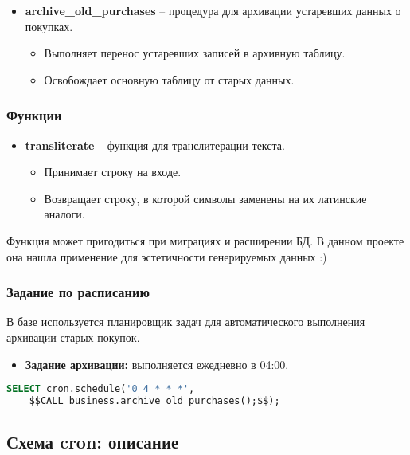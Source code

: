 \begin{itemize}
    \item \textbf{archive\_old\_purchases} – процедура для архивации устаревших данных о покупках.
    \begin{itemize}
        \item Выполняет перенос устаревших записей в архивную таблицу.
        \item Освобождает основную таблицу от старых данных.
    \end{itemize}
\end{itemize}

\subsubsection{Функции}

\begin{itemize}
    \item \textbf{transliterate} – функция для транслитерации текста.
    \begin{itemize}
        \item Принимает строку на входе.
        \item Возвращает строку, в которой символы заменены на их латинские аналоги.
    \end{itemize}
\end{itemize}

Функция может пригодиться при миграциях и расширении БД.
В данном проекте она нашла применение для эстетичности генерируемых данных :)

\subsubsection{Задание по расписанию}

В базе используется планировщик задач для автоматического выполнения архивации старых покупок.

\begin{itemize}
    \item \textbf{Задание архивации:} выполняется ежедневно в 04:00.
\end{itemize}

\begin{lstlisting}[language=SQL, frame=single, basicstyle=\normalsize\ttfamily, breaklines=true,label={lst:cronsql}]
SELECT cron.schedule('0 4 * * *',
    $$CALL business.archive_old_purchases();$$);
\end{lstlisting}

\subsection{Схема cron: описание}\label{subsec:-crondesc:-}

